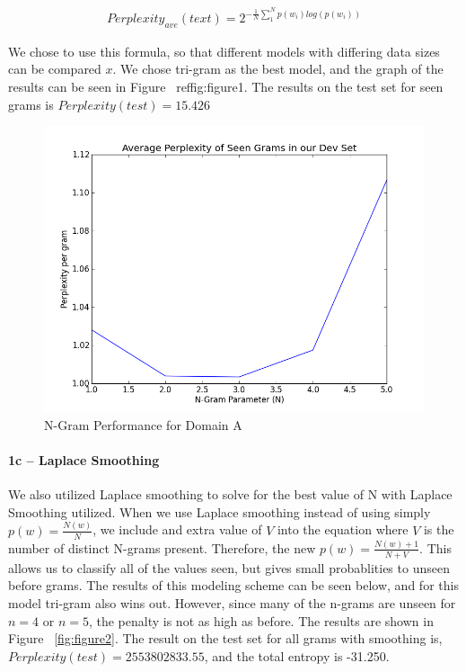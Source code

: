 \documentclass[paper=a4, fontsize=11pt]{scrartcl} %
\begin{document}
\begin{align}
Perplexity_{ave}(text) = 2^{-\frac{1}{N}\sum_1^N p(w_i)log(p(w_i))}
\end{align}

We chose to use this formula, so that different models with differing data sizes can be compared $x$.
We chose tri-gram as the best model, and the graph of the results can be seen in Figure ~ref{fig:figure1}.  The results on the test set for seen grams is $Perplexity(test)=15.426$

\begin{figure}
\centering
\includegraphics[scale=0.4]{figure_1.png}
\caption{N-Gram Performance for Domain A}
\label{fig:figure1}
\end{figure}

\paragraph{1c -- Laplace Smoothing}
We also utilized Laplace smoothing to solve for the best value of N with Laplace Smoothing utilized.  When we use Laplace smoothing instead of using simply $p(w)=\frac{N(w)}{N}$, we include and extra value of $V$ into the equation where $V$ is the number of distinct N-grams present.  Therefore, the new $p(w) = \frac{N(w)+1}{N+V}$.  This allows us to classify all of the values seen, but gives small probablities to unseen before grams.  The results of this modeling scheme can be seen below, and for this model tri-gram also wins out.  
However, since many of the n-grams are unseen for $n=4$ or $n=5$, the penalty is not as high as before.  The results are shown in Figure ~\ref{fig:figure2}.  
The result on the test set for all grams with smoothing is,  $Perplexity(test)=2553802833.55$, and the total entropy is -31.250.
\end{document}
